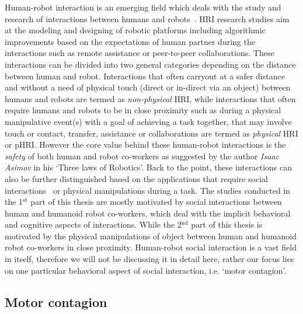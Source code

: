 Human-robot interaction is an emerging field which deals with the study and research of interactions between humans and robots~\cite{goodrich2008human}. HRI research studies aim at the modeling and designing of robotic platforms including algorithmic improvements based on the expectations of human partner during the interactions such as remote assistance or peer-to-peer collaborations. These interactions can be divided into two general categories depending on the distance between human and robot. Interactions that often carryout at a safer distance and without a need of physical touch (direct or in-direct via an object) between humans and robots are termed as \textit{non-physical} HRI, while interactions that often require humans and robots to be in close proximity such as during a physical manipulative event(s) with a goal of achieving a task together, that may involve touch or contact, transfer, assistance or collaborations are termed as \textit{physical} HRI or pHRI. However the core value behind these human-robot interactions is the \textit{safety} of both human and robot co-workers as suggested by the author \textit{Isaac Asimov} in his `Three laws of Robotics'. Back to the point, these interactions can also be further distinguished based on the applications that require social interactions~\cite{tzafestas2016human, Chaminade:JPP:2009} or physical manipulations during a task. The studies conducted in the 1$^\text{st}$ part of this thesis are mostly motivated by social interactions between human and humanoid robot co-workers, which deal with the implicit behavioral and cognitive aspects of interactions. While the 2$^\text{nd}$ part of this thesis is motivated by the physical manipulations of object between human and humanoid robot co-workers in close proximity. Human-robot social interaction is a vast field in itself, therefore we will not be discussing it in detail here, rather our focus lies on one particular behavioral aspect of social interaction, i.e. `motor contagion'.


\subsection{Motor contagion}\label{motor contagions}

